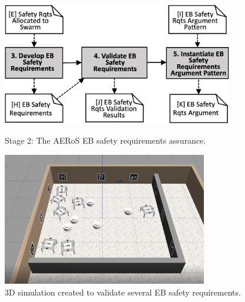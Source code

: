 \documentclass[runningheads]{llncs}
\begin{document}
\begin{figure}[!t]
	\centering
	\begin{minipage}{.57\textwidth}
		\centering
		\includegraphics[width=0.9\textwidth]{figures/amlas-a-stage2-v3.png}
		\vspace{-2ex}
		\caption{Stage 2: The AERoS EB safety \newline requirements assurance.}%
	\label{amlas-a-stage2}
\end{minipage}%
\begin{minipage}{.43\textwidth}
	\centering
	\includegraphics[trim={30mm 25mm 45mm 30mm},clip,width=0.8\textwidth]{figures/3Dsim.png}
	\vspace{-2ex}
	\caption{3D simulation created to \newline validate several EB safety requirements.}
	\label{3Dsim}
\end{minipage}
\vspace{-4ex}
\end{figure}

\end{document}
